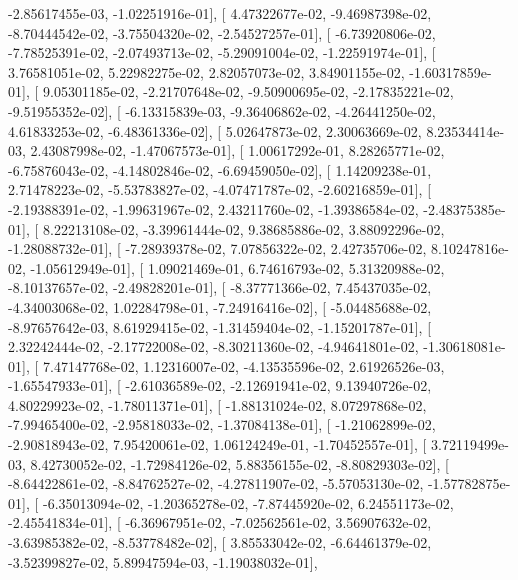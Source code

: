 \documentclass{article}
\begin{document}
         -2.85617455e-03,  -1.02251916e-01],
       [  4.47322677e-02,  -9.46987398e-02,  -8.70444542e-02,
         -3.75504320e-02,  -2.54527257e-01],
       [ -6.73920806e-02,  -7.78525391e-02,  -2.07493713e-02,
         -5.29091004e-02,  -1.22591974e-01],
       [  3.76581051e-02,   5.22982275e-02,   2.82057073e-02,
          3.84901155e-02,  -1.60317859e-01],
       [  9.05301185e-02,  -2.21707648e-02,  -9.50900695e-02,
         -2.17835221e-02,  -9.51955352e-02],
       [ -6.13315839e-03,  -9.36406862e-02,  -4.26441250e-02,
          4.61833253e-02,  -6.48361336e-02],
       [  5.02647873e-02,   2.30063669e-02,   8.23534414e-03,
          2.43087998e-02,  -1.47067573e-01],
       [  1.00617292e-01,   8.28265771e-02,  -6.75876043e-02,
         -4.14802846e-02,  -6.69459050e-02],
       [  1.14209238e-01,   2.71478223e-02,  -5.53783827e-02,
         -4.07471787e-02,  -2.60216859e-01],
       [ -2.19388391e-02,  -1.99631967e-02,   2.43211760e-02,
         -1.39386584e-02,  -2.48375385e-01],
       [  8.22213108e-02,  -3.39961444e-02,   9.38685886e-02,
          3.88092296e-02,  -1.28088732e-01],
       [ -7.28939378e-02,   7.07856322e-02,   2.42735706e-02,
          8.10247816e-02,  -1.05612949e-01],
       [  1.09021469e-01,   6.74616793e-02,   5.31320988e-02,
         -8.10137657e-02,  -2.49828201e-01],
       [ -8.37771366e-02,   7.45437035e-02,  -4.34003068e-02,
          1.02284798e-01,  -7.24916416e-02],
       [ -5.04485688e-02,  -8.97657642e-03,   8.61929415e-02,
         -1.31459404e-02,  -1.15201787e-01],
       [  2.32242444e-02,  -2.17722008e-02,  -8.30211360e-02,
         -4.94641801e-02,  -1.30618081e-01],
       [  7.47147768e-02,   1.12316007e-02,  -4.13535596e-02,
          2.61926526e-03,  -1.65547933e-01],
       [ -2.61036589e-02,  -2.12691941e-02,   9.13940726e-02,
          4.80229923e-02,  -1.78011371e-01],
       [ -1.88131024e-02,   8.07297868e-02,  -7.99465400e-02,
         -2.95818033e-02,  -1.37084138e-01],
       [ -1.21062899e-02,  -2.90818943e-02,   7.95420061e-02,
          1.06124249e-01,  -1.70452557e-01],
       [  3.72119499e-03,   8.42730052e-02,  -1.72984126e-02,
          5.88356155e-02,  -8.80829303e-02],
       [ -8.64422861e-02,  -8.84762527e-02,  -4.27811907e-02,
         -5.57053130e-02,  -1.57782875e-01],
       [ -6.35013094e-02,  -1.20365278e-02,  -7.87445920e-02,
          6.24551173e-02,  -2.45541834e-01],
       [ -6.36967951e-02,  -7.02562561e-02,   3.56907632e-02,
         -3.63985382e-02,  -8.53778482e-02],
       [  3.85533042e-02,  -6.64461379e-02,  -3.52399827e-02,
          5.89947594e-03,  -1.19038032e-01],
\end{document}
